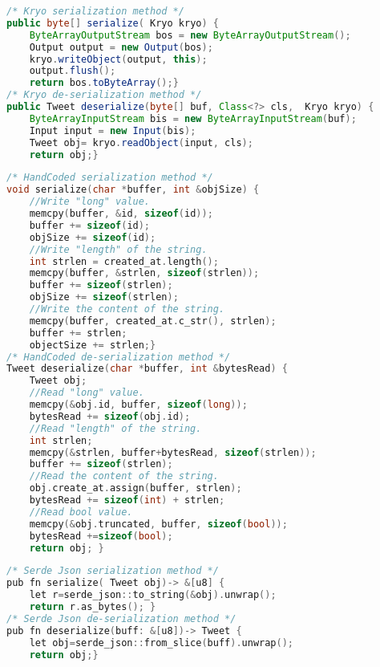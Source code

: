 


   \begin{lstlisting}[language=java,title={a) Java Kryo},captionpos=b]   
/* Kryo serialization method */		  
public byte[] serialize( Kryo kryo) {		   
	ByteArrayOutputStream bos = new ByteArrayOutputStream();
	Output output = new Output(bos);			   
	kryo.writeObject(output, this);
	output.flush();			    
	return bos.toByteArray();}    
/* Kryo de-serialization method */			  
public Tweet deserialize(byte[] buf, Class<?> cls,  Kryo kryo) {
	ByteArrayInputStream bis = new ByteArrayInputStream(buf);
	Input input = new Input(bis);	    	    
	Tweet obj= kryo.readObject(input, cls);
	return obj;}
    \end{lstlisting}
    
    \begin{lstlisting}[language=c++,title={b) C++ HandCoded},captionpos=b]       	
/* HandCoded serialization method */		  
void serialize(char *buffer, int &objSize) {
	//Write "long" value.
	memcpy(buffer, &id, sizeof(id));
	buffer += sizeof(id);
	objSize += sizeof(id);	   	
	//Write "length" of the string.
	int strlen = created_at.length();
	memcpy(buffer, &strlen, sizeof(strlen));
	buffer += sizeof(strlen);
	objSize += sizeof(strlen);	
	//Write the content of the string.
	memcpy(buffer, created_at.c_str(), strlen);
	buffer += strlen;
	objectSize += strlen;}	   
/* HandCoded de-serialization method */
Tweet deserialize(char *buffer, int &bytesRead) {
	Tweet obj;
	//Read "long" value.
	memcpy(&obj.id, buffer, sizeof(long));
	bytesRead += sizeof(obj.id);	
	//Read "length" of the string.
	int strlen;
	memcpy(&strlen, buffer+bytesRead, sizeof(strlen));
	buffer += sizeof(strlen);	   	
	//Read the content of the string.
	obj.create_at.assign(buffer, strlen);
	bytesRead += sizeof(int) + strlen;	
	//Read bool value.
	memcpy(&obj.truncated, buffer, sizeof(bool));
	bytesRead +=sizeof(bool);
	return obj;	}
    \end{lstlisting}
    
    
    \begin{lstlisting}[language=C,title={c) Rust Json},captionpos=b]   
/* Serde Json serialization method */		  
pub fn serialize( Tweet obj)-> &[u8] {		   
	let r=serde_json::to_string(&obj).unwrap();		    
	return r.as_bytes(); }    
/* Serde Json de-serialization method */			  
pub fn deserialize(buff: &[u8])-> Tweet {		   
	let obj=serde_json::from_slice(buff).unwrap();
	return obj;}    
    \end{lstlisting}
    
    